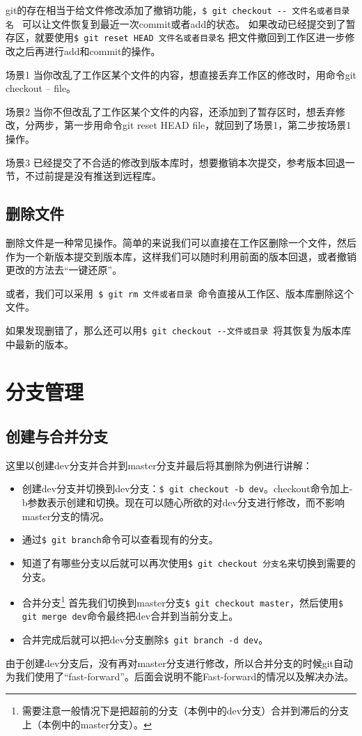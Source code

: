 \documentclass[UTF8]{ctexart}
\begin{document}
git的存在相当于给文件修改添加了撤销功能，\verb!$ git checkout -- 文件名或者目录名 ! 可以让文件恢复到最近一次commit或者add的状态。
如果改动已经提交到了暂存区，就要使用\verb!$ git reset HEAD 文件名或者目录名! 把文件撤回到工作区进一步修改之后再进行add和commit的操作。

\begin{list}{场景}{\textbf{撤销更改的几种情况}}
\item[场景1]当你改乱了工作区某个文件的内容，想直接丢弃工作区的修改时，用命令git checkout -- file。
\item[场景2]当你不但改乱了工作区某个文件的内容，还添加到了暂存区时，想丢弃修改，分两步，第一步用命令git reset HEAD file，就回到了场景1，第二步按场景1操作。
\item[场景3]已经提交了不合适的修改到版本库时，想要撤销本次提交，参考版本回退一节，不过前提是没有推送到远程库。
\end{list}

\subsection{删除文件}
删除文件是一种常见操作。简单的来说我们可以直接在工作区删除一个文件，然后作为一个新版本提交到版本库，这样我们可以随时利用前面的版本回退，或者撤销更改的方法去“一键还原”。

或者，我们可以采用\verb! $ git rm 文件或者目录 !命令直接从工作区、版本库删除这个文件。

如果发现删错了，那么还可以用\verb!$ git checkout --文件或目录 !将其恢复为版本库中最新的版本。

\section{分支管理}
\subsection{创建与合并分支}
这里以创建dev分支并合并到master分支并最后将其删除为例进行讲解：
\begin{itemize}
\item 创建dev分支并切换到dev分支：\verb!$ git checkout -b dev!。checkout命令加上-b参数表示创建和切换。现在可以随心所欲的对dev分支进行修改，而不影响master分支的情况。
\item 通过\verb!$ git branch!命令可以查看现有的分支。
\item 知道了有哪些分支以后就可以再次使用\verb!$ git checkout 分支名!来切换到需要的分支。
\item 合并分支\footnote{需要注意一般情况下是把超前的分支（本例中的dev分支）合并到滞后的分支上（本例中的master分支）。} 首先我们切换到master分支\verb!$ git checkout master!，然后使用\verb!$ git merge dev!命令最终把dev合并到当前分支上。
\item 合并完成后就可以把dev分支删除\verb!$ git branch -d dev!。
\end{itemize}
由于创建dev分支后，没有再对master分支进行修改，所以合并分支的时候git自动为我们使用了“fast-forward”。后面会说明不能Fast-forward的情况以及解决办法。
\end{document}
